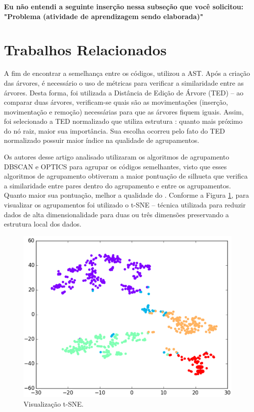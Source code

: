 			\textbf{Eu não entendi a seguinte inserção nessa subseção que você solicitou:
				"Problema (atividade de aprendizagem sendo elaborada)"}

	\section{Trabalhos Relacionados}
	\label{sec:TrabRel}
	
	    A fim de encontrar a semelhança entre os códigos, 
	    utilizou a AST. Após a criação das árvores, é necessário o uso de métricas
	    para verificar a similaridade entre as árvores. Desta forma, foi utilizada
	    a Distância de Edição de Árvore (TED) – ao comparar duas árvores, verificam-se
	    quais são as movimentações (inserção, movimentação e remoção) necessárias
	    para que as árvores fiquem iguais. Assim, foi selecionado a TED normalizado
	    que utiliza estrutura : quanto mais próximo do nó raiz,
	    maior sua importância. Sua escolha ocorreu pelo fato do TED normalizado
	    possuir maior índice na qualidade de agrupamentos.
	    
	    Os autores desse artigo analisado utilizaram os algoritmos de agrupamento
	    DBSCAN \cite{Ester1996} e OPTICS \cite{Ankerst1999} para agrupar os códigos
	    semelhantes, visto que esses algoritmos de agrupamento obtiveram a maior
	    pontuação de silhueta que verifica a similaridade entre pares dentro do
	    agrupamento e entre os agrupamentos. Quanto maior sua pontuação, melhor a
	    qualidade do . Conforme a Figura \ref{fig:t-SNE}, para
	    visualizar os agrupamentos foi utilizado o t-SNE \cite{maaten2008} – técnica
	    utilizada para reduzir dados de alta dimensionalidade para duas ou três
	    dimensões preservando a estrutura local dos dados.
	    
	    \begin{figure}[ht]
	        \centering
	        \includegraphics[scale=0.5]{imagem/visualizacao-tSNE.png}
	        \captionsetup{justification=centering}
	        \caption{Visualização t-SNE.}
	        \label{fig:t-SNE}
	    \end{figure}
	    
